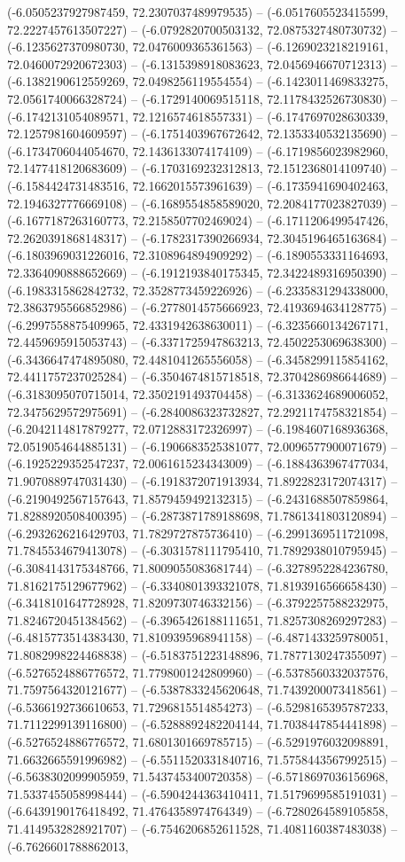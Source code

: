(-6.0505237927987459, 72.2307037489979535) -- (-6.0517605523415599, 72.2227457613507227) -- (-6.0792820700503132, 72.0875327480730732) -- (-6.1235627370980730, 72.0476009365361563) -- (-6.1269023218219161, 72.0460072920672303) -- (-6.1315398918083623, 72.0456946670712313) -- (-6.1382190612559269, 72.0498256119554554) -- (-6.1423011469833275, 72.0561740066328724) -- (-6.1729140069515118, 72.1178432526730830) -- (-6.1742131054089571, 72.1216574618557331) -- (-6.1747697028630339, 72.1257981604609597) -- (-6.1751403967672642, 72.1353340532135690) -- (-6.1734706044054670, 72.1436133074174109) -- (-6.1719856023982960, 72.1477418120683609) -- (-6.1703169232312813, 72.1512368014109740) -- (-6.1584424731483516, 72.1662015573961639) -- (-6.1735941690402463, 72.1946327776669108) -- (-6.1689554858589020, 72.2084177023827039) -- (-6.1677187263160773, 72.2158507702469024) -- (-6.1711206499547426, 72.2620391868148317) -- (-6.1782317390266934, 72.3045196465163684) -- (-6.1803969031226016, 72.3108964894909292) -- (-6.1890553331164693, 72.3364090888652669) -- (-6.1912193840175345, 72.3422489316950390) -- (-6.1983315862842732, 72.3528773459226926) -- (-6.2335831294338000, 72.3863795566852986) -- (-6.2778014575666923, 72.4193694634128775) -- (-6.2997558875409965, 72.4331942638630011) -- (-6.3235660134267171, 72.4459695915053743) -- (-6.3371725947863213, 72.4502253069638300) -- (-6.3436647474895080, 72.4481041265556058) -- (-6.3458299115854162, 72.4411757237025284) -- (-6.3504674815718518, 72.3704286986644689) -- (-6.3183095070715014, 72.3502191493704458) -- (-6.3133624689006052, 72.3475629572975691) -- (-6.2840086323732827, 72.2921174758321854) -- (-6.2042114817879277, 72.0712883172326997) -- (-6.1984607168936368, 72.0519054644885131) -- (-6.1906683525381077, 72.0096577900071679) -- (-6.1925229352547237, 72.0061615234343009) -- (-6.1884363967477034, 71.9070889747031430) -- (-6.1918372071913934, 71.8922823172074317) -- (-6.2190492567157643, 71.8579459492132315) -- (-6.2431688507859864, 71.8288920508400395) -- (-6.2873871789188698, 71.7861341803120894) -- (-6.2932626216429703, 71.7829727875736410) -- (-6.2991369511721098, 71.7845534679413078) -- (-6.3031578111795410, 71.7892938010795945) -- (-6.3084143175348766, 71.8009055083681744) -- (-6.3278952284236780, 71.8162175129677962) -- (-6.3340801393321078, 71.8193916566658430) -- (-6.3418101647728928, 71.8209730746332156) -- (-6.3792257588232975, 71.8246720451384562) -- (-6.3965426188111651, 71.8257308269297283) -- (-6.4815773514383430, 71.8109395968941158) -- (-6.4871433259780051, 71.8082998224468838) -- (-6.5183751223148896, 71.7877130247355097) -- (-6.5276524886776572, 71.7798001242809960) -- (-6.5378560332037576, 71.7597564320121677) -- (-6.5387833245620648, 71.7439200073418561) -- (-6.5366192736610653, 71.7296815514854273) -- (-6.5298165395787233, 71.7112299139116800) -- (-6.5288892482204144, 71.7038447854441898) -- (-6.5276524886776572, 71.6801301669785715) -- (-6.5291976032098891, 71.6632665591996982) -- (-6.5511520331840716, 71.5758443567992515) -- (-6.5638302099905959, 71.5437453400720358) -- (-6.5718697036156968, 71.5337455058998444) -- (-6.5904244363410411, 71.5179699585191031) -- (-6.6439190176418492, 71.4764358974764349) -- (-6.7280264589105858, 71.4149532828921707) -- (-6.7546206852611528, 71.4081160387483038) -- (-6.7626601788862013, 